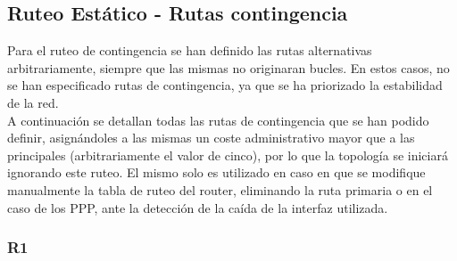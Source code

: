 \subsection{Ruteo Estático - Rutas contingencia}
Para el ruteo de contingencia se han definido las rutas alternativas arbitrariamente, siempre que las
mismas no originaran bucles. En estos casos, no se han especificado rutas de contingencia, ya que se ha priorizado
la estabilidad de la red. \\
\indent A continuación se detallan todas las rutas de contingencia que se han podido definir, asignándoles a las mismas
un coste administrativo mayor que a las principales (arbitrariamente el valor de cinco), por lo que la topología se 
iniciará ignorando este ruteo. El mismo solo es utilizado en caso en que se modifique manualmente la tabla de ruteo del router, 
eliminando la ruta primaria o en el caso de los PPP, ante la detección de la caída de la interfaz utilizada.


\subsubsection{R1}

